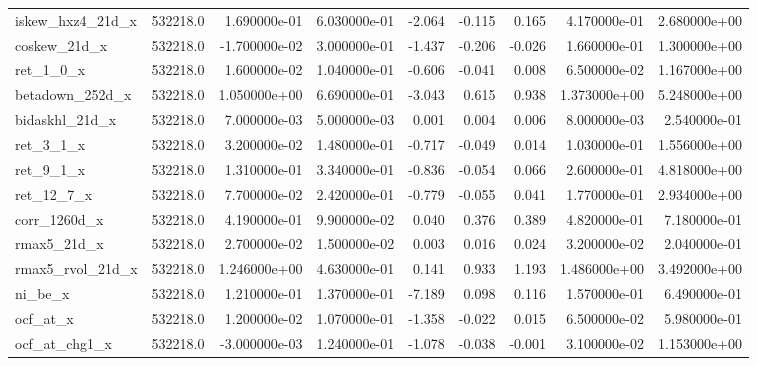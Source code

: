 \documentclass[12pt]{article}
\begin{document}
{\begin{landscape}
\begin{longtable}{|l|r|r|r|r|r|r|r|r|}
iskew\_hxz4\_21d\_x       &  532218.0 &  1.690000e-01 &  6.030000e-01 &      -2.064 &       -0.115 &        0.165 &  4.170000e-01 &  2.680000e+00 \\
coskew\_21d\_x           &  532218.0 & -1.700000e-02 &  3.000000e-01 &      -1.437 &       -0.206 &       -0.026 &  1.660000e-01 &  1.300000e+00 \\
ret\_1\_0\_x              &  532218.0 &  1.600000e-02 &  1.040000e-01 &      -0.606 &       -0.041 &        0.008 &  6.500000e-02 &  1.167000e+00 \\
betadown\_252d\_x        &  532218.0 &  1.050000e+00 &  6.690000e-01 &      -3.043 &        0.615 &        0.938 &  1.373000e+00 &  5.248000e+00 \\
bidaskhl\_21d\_x         &  532218.0 &  7.000000e-03 &  5.000000e-03 &       0.001 &        0.004 &        0.006 &  8.000000e-03 &  2.540000e-01 \\
ret\_3\_1\_x              &  532218.0 &  3.200000e-02 &  1.480000e-01 &      -0.717 &       -0.049 &        0.014 &  1.030000e-01 &  1.556000e+00 \\
ret\_9\_1\_x              &  532218.0 &  1.310000e-01 &  3.340000e-01 &      -0.836 &       -0.054 &        0.066 &  2.600000e-01 &  4.818000e+00 \\
ret\_12\_7\_x             &  532218.0 &  7.700000e-02 &  2.420000e-01 &      -0.779 &       -0.055 &        0.041 &  1.770000e-01 &  2.934000e+00 \\
corr\_1260d\_x           &  532218.0 &  4.190000e-01 &  9.900000e-02 &       0.040 &        0.376 &        0.389 &  4.820000e-01 &  7.180000e-01 \\
rmax5\_21d\_x            &  532218.0 &  2.700000e-02 &  1.500000e-02 &       0.003 &        0.016 &        0.024 &  3.200000e-02 &  2.040000e-01 \\
rmax5\_rvol\_21d\_x       &  532218.0 &  1.246000e+00 &  4.630000e-01 &       0.141 &        0.933 &        1.193 &  1.486000e+00 &  3.492000e+00 \\
ni\_be\_x                &  532218.0 &  1.210000e-01 &  1.370000e-01 &      -7.189 &        0.098 &        0.116 &  1.570000e-01 &  6.490000e-01 \\
ocf\_at\_x               &  532218.0 &  1.200000e-02 &  1.070000e-01 &      -1.358 &       -0.022 &        0.015 &  6.500000e-02 &  5.980000e-01 \\
ocf\_at\_chg1\_x          &  532218.0 & -3.000000e-03 &  1.240000e-01 &      -1.078 &       -0.038 &       -0.001 &  3.100000e-02 &  1.153000e+00 \\

\end{longtable}
\end{landscape}}
\end{document}
